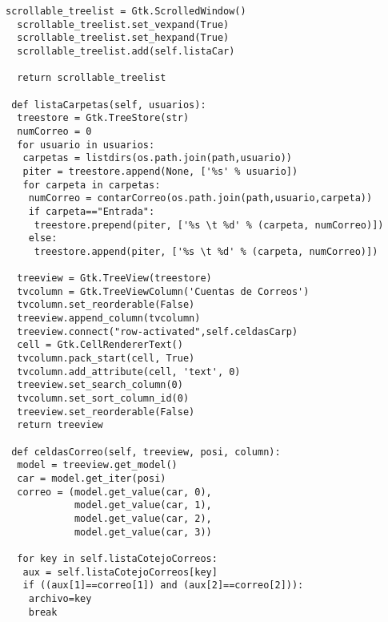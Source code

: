 \begin{lstlisting}[frame=single]
  scrollable_treelist = Gtk.ScrolledWindow()
  scrollable_treelist.set_vexpand(True)
  scrollable_treelist.set_hexpand(True)
  scrollable_treelist.add(self.listaCar)
  
  return scrollable_treelist

 def listaCarpetas(self, usuarios):
  treestore = Gtk.TreeStore(str)
  numCorreo = 0
  for usuario in usuarios:
   carpetas = listdirs(os.path.join(path,usuario))
   piter = treestore.append(None, ['%s' % usuario])
   for carpeta in carpetas:
    numCorreo = contarCorreo(os.path.join(path,usuario,carpeta))
    if carpeta=="Entrada":
     treestore.prepend(piter, ['%s \t %d' % (carpeta, numCorreo)])
    else:
     treestore.append(piter, ['%s \t %d' % (carpeta, numCorreo)])

  treeview = Gtk.TreeView(treestore)   
  tvcolumn = Gtk.TreeViewColumn('Cuentas de Correos')
  tvcolumn.set_reorderable(False)
  treeview.append_column(tvcolumn)
  treeview.connect("row-activated",self.celdasCarp)
  cell = Gtk.CellRendererText()
  tvcolumn.pack_start(cell, True)
  tvcolumn.add_attribute(cell, 'text', 0)
  treeview.set_search_column(0)
  tvcolumn.set_sort_column_id(0)
  treeview.set_reorderable(False)
  return treeview

 def celdasCorreo(self, treeview, posi, column):
  model = treeview.get_model()
  car = model.get_iter(posi)
  correo = (model.get_value(car, 0),
            model.get_value(car, 1),
            model.get_value(car, 2),
            model.get_value(car, 3))
            
  for key in self.listaCotejoCorreos:
   aux = self.listaCotejoCorreos[key]
   if ((aux[1]==correo[1]) and (aux[2]==correo[2])):
    archivo=key
    break
\end{lstlisting}
